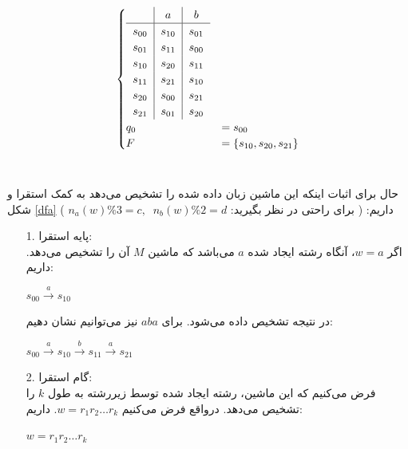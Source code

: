 \begin{enumerate}
\begin{center}
\begin{equation*}
\begin{cases}
        \begin{tabular}{c|c|c}
         & $a$ & $b$ \\ \hline
        $s_{00}$ & $s_{10}$ &$s_{01}$\\
        $s_{01}$ & $s_{11}$ &$s_{00}$\\
        $s_{10}$ & $s_{20}$ &$s_{11}$\\
        $s_{11}$ & $s_{21}$ &$s_{10}$\\
        $s_{20}$ & $s_{00}$ &$s_{21}$\\
        $s_{21}$ & $s_{01}$ &$s_{20}$\\
        \end{tabular}\\[0.1in]
        q_0 &= s_{00}\\
        F &= \{s_{10}, s_{20}, s_{21}\}\\
    \end{cases}
    \end{equation*}
    \\[0.2in]
\end{center}
حال برای اثبات اینکه این ماشین زبان داده شده را تشخیص می‌دهد به کمک استقرا و شکل \ref{dfa} داریم:\newline
( برای راحتی در نظر بگیرید: $n_a(w)\%3 = c, \;\; n_b(w)\%2=d$ )
\begin{enumerate}
    \item[1.] پایه استقرا:\\[0.1in]
    اگر $w = a$، آنگاه رشته ایجاد شده $a$ می‌باشد که ماشین $M$ آن را تشخیص می‌دهد. داریم:\\[0.05in]
    \begin{center}
        $s_{00} \xrightarrow{a} s_{10}$\\[0.05in]
    \end{center}
    در نتیجه تشخیص داده می‌شود. برای $aba$ نیز می‌توانیم نشان دهیم:\\[0.05in]
    \begin{center}
        $s_{00} \xrightarrow{a} s_{10} \xrightarrow{b} s_{11}
        \xrightarrow{a} s_{21}$\\[0.05in]
    \end{center}
    \item[2.] گام استقرا:\\[0.1in]
    فرض می‌کنیم که این ماشین، رشته ایجاد شده توسط زیررشته به طول $k$ را تشخیص می‌دهد.
    درواقع فرض می‌کنیم $w = r_1r_2\ldots r_{k}$. داریم:\\[0.1in]
    \begin{center}
        $w = r_1r_2\ldots r_{k}$\\[0.07in]

\end{center}
\end{enumerate}
\end{enumerate}
